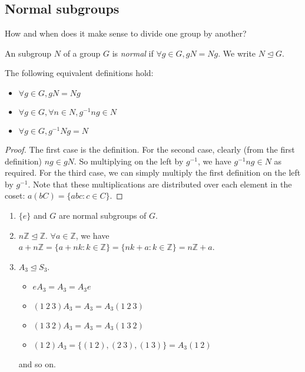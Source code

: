\subsection{Normal subgroups}
How and when does it make sense to divide one group by another?
\begin{definition}
	An subgroup \(N\) of a group \(G\) is \textit{normal} if \(\forall g \in G, gN = Ng\).
	We write \(N \trianglelefteq G\).
\end{definition}
\noindent The following equivalent definitions hold:
\begin{itemize}
	\item \(\forall g \in G, gN = Ng\)
	\item \(\forall g \in G, \forall n \in N, g^{-1}ng \in N\)
	\item \(\forall g \in G, g^{-1}Ng = N\)
\end{itemize}
\begin{proof}
	The first case is the definition.
	For the second case, clearly (from the first definition) \(ng \in gN\).
	So multiplying on the left by \(g^{-1}\), we have \(g^{-1}ng \in N\) as required.
	For the third case, we can simply multiply the first definition on the left by \(g^{-1}\).
	Note that these multiplications are distributed over each element in the coset: \(a(bC) = \{ abc : c \in C \}\).
\end{proof}

\begin{enumerate}
	\item \(\{ e \}\) and \(G\) are normal subgroups of \(G\).
	\item \(n\mathbb Z \trianglelefteq \mathbb Z\).
	      \(\forall a \in \mathbb Z\), we have \(a + n\mathbb Z = \{ a + nk : k \in \mathbb Z \} = \{ nk + a : k \in \mathbb Z \} = n\mathbb Z + a\).
	\item \(A_3 \trianglelefteq S_3\).
	      \begin{itemize}
		      \item \(eA_3 = A_3 = A_3 e\)
		      \item \((1\ 2\ 3)A_3 = A_3 = A_3(1\ 2\ 3)\)
		      \item \((1\ 3\ 2)A_3 = A_3 = A_3(1\ 3\ 2)\)
		      \item \((1\ 2)A_3 = \{ (1\ 2), (2\ 3), (1\ 3) \} = A_3(1\ 2)\)
	      \end{itemize}
	      and so on.
\end{enumerate}

